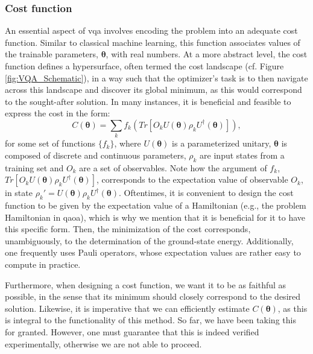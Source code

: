 \subsubsection*{\small Cost function}
An essential aspect of \acrshort{vqa} involves encoding the problem into an adequate cost function. Similar to classical machine learning, this function associates values of the trainable parameters, $\boldsymbol{\theta}$, with real numbers. At a more abstract level, the cost function defines a hypersurface, often termed the cost landscape (cf. Figure \ref{fig:VQA_Schematic}), in a way such that the optimizer's task is to then navigate across this landscape and discover its global minimum, as this would correspond to the sought-after solution. In many instances, it is beneficial and feasible to express the cost in the form:
\begin{equation}\label{eq:Cost}
    C(\boldsymbol{\theta}) = \sum_k f_k\left( Tr\left[O_k U(\boldsymbol{\theta}) \rho_k U^{\dagger}(\boldsymbol{\theta})\right] \right),
\end{equation}
for some set of functions $\{f_k\}$, where $U(\boldsymbol{\theta})$ is a parameterized unitary, $\boldsymbol{\theta}$ is composed of discrete and continuous parameters, $\rho_k$ are input states from a training set and $O_k$ are a set of observables. Note how the argument of $f_k$, $Tr\left[O_k U(\boldsymbol{\theta}) \rho_k U^{\dagger}(\boldsymbol{\theta})\right]$, corresponds to the expectation value of observable $O_k$, in state $\rho_k' = U(\boldsymbol{\theta}) \rho_k U^{\dagger}(\boldsymbol{\theta})$. Oftentimes, it is convenient to design the cost function to be given by the expectation value of a Hamiltonian (e.g., the problem Hamiltonian in \acrshort{qaoa}), which is why we mention that it is beneficial for it to have this specific form. Then, the minimization of the cost corresponds, unambiguously, to the determination of the ground-state energy. Additionally, one frequently uses Pauli operators, whose expectation values are rather easy to compute in practice.

Furthermore, when designing a cost function, we want it to be as faithful as possible, in the sense that its minimum should closely correspond to the desired solution. Likewise, it is imperative that we can efficiently estimate $C(\boldsymbol{\theta})$, as this is integral to the functionality of this method. So far, we have been taking this for granted. However, one must guarantee that this is indeed verified experimentally, otherwise we are not able to proceed.


